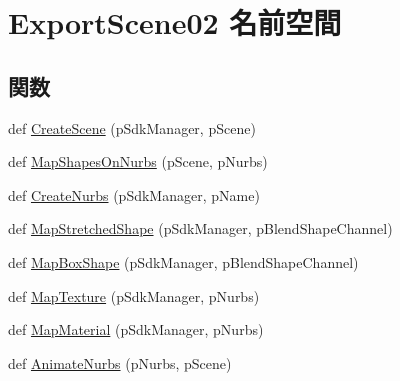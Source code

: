 \hypertarget{namespace_export_scene02}{}\section{Export\+Scene02 名前空間}
\label{namespace_export_scene02}
\subsection*{関数}
\begin{DoxyCompactItemize}
\item 
def \hyperlink{namespace_export_scene02_ab05e0f19c09bbd1997ef575f237d317e}{Create\+Scene} (p\+Sdk\+Manager, p\+Scene)
\item 
def \hyperlink{namespace_export_scene02_a0d084226d31775fe7fe5f5f8c2fc0c24}{Map\+Shapes\+On\+Nurbs} (p\+Scene, p\+Nurbs)
\item 
def \hyperlink{namespace_export_scene02_a1bc6888735786ae7f0f9f3cb9066e31d}{Create\+Nurbs} (p\+Sdk\+Manager, p\+Name)
\item 
def \hyperlink{namespace_export_scene02_ad6a8e22e1614bca802fa42cc98d0be70}{Map\+Stretched\+Shape} (p\+Sdk\+Manager, p\+Blend\+Shape\+Channel)
\item 
def \hyperlink{namespace_export_scene02_adc6a1f38f469ce06003f6969995c6fd4}{Map\+Box\+Shape} (p\+Sdk\+Manager, p\+Blend\+Shape\+Channel)
\item 
def \hyperlink{namespace_export_scene02_abda1e709837c1815c794e3fae84ac3d9}{Map\+Texture} (p\+Sdk\+Manager, p\+Nurbs)
\item 
def \hyperlink{namespace_export_scene02_a8d94a0b4d915d041f4ac8518556d3d4f}{Map\+Material} (p\+Sdk\+Manager, p\+Nurbs)
\item 
def \hyperlink{namespace_export_scene02_a805bac515538b7dad240485e844c6545}{Animate\+Nurbs} (p\+Nurbs, p\+Scene)
\end{DoxyCompactItemize}
